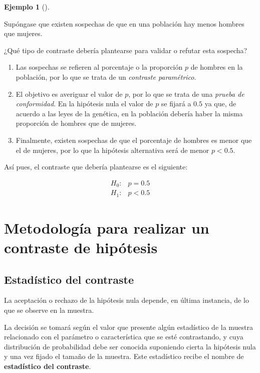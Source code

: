 \documentclass[
  a4paper,
]{scrreport}
\theoremstyle{plain}
\theoremstyle{definition}
\newtheorem{example}{Ejemplo}[chapter]
\theoremstyle{definition}
\theoremstyle{remark}
\begin{document}
\begin{example}[]\protect\hypertarget{exm-eleccion-tipo-contraste}{}\label{exm-eleccion-tipo-contraste}

Supóngase que existen sospechas de que en una población hay menos
hombres que mujeres.

¿Qué tipo de contraste debería plantearse para validar o refutar esta
sospecha?

\begin{enumerate}
\def\labelenumi{\arabic{enumi}.}
\item
  Las sospechas se refieren al porcentaje o la proporción \(p\) de
  hombres en la población, por lo que se trata de un \emph{contraste
  paramétrico}.
\item
  El objetivo es averiguar el valor de \(p\), por lo que se trata de una
  \emph{prueba de conformidad}. En la hipótesis nula el valor de \(p\)
  se fijará a \(0.5\) ya que, de acuerdo a las leyes de la genética, en
  la población debería haber la misma proporción de hombres que de
  mujeres.
\item
  Finalmente, existen sospechas de que el porcentaje de hombres es menor
  que el de mujeres, por lo que la hipótesis alternativa será de menor
  \(p<0.5\).
\end{enumerate}

Así pues, el contraste que debería plantearse es el siguiente:

\begin{align*}
H_0: & p=0.5 \\
H_1: & p<0.5
\end{align*}

\end{example}

\section{Metodología para realizar un contraste de
hipótesis}\label{metodologuxeda-para-realizar-un-contraste-de-hipuxf3tesis}

\subsection{Estadístico del
contraste}\label{estaduxedstico-del-contraste}

La aceptación o rechazo de la hipótesis nula depende, en última
instancia, de lo que se observe en la muestra.

La decisión se tomará según el valor que presente algún estadístico de
la muestra relacionado con el parámetro o característica que se esté
contrastando, y cuya distribución de probabilidad debe ser conocida
suponiendo cierta la hipótesis nula y una vez fijado el tamaño de la
muestra. Este estadístico recibe el nombre de \textbf{estadístico del
contraste}.
\end{document}
